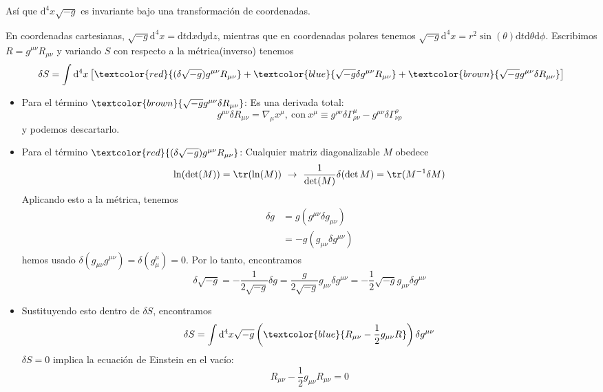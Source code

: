 \documentclass[../main]{subfiles}
\begin{document}
Así que $\mathrm{d}^4 x \sqrt{-g}$ es invariante bajo una transformación de coordenadas.

\ejemplo{} En coordenadas cartesianas, $\sqrt{-g} \mathrm{d}^4 x=\mathrm{d}t\mathrm{d}x\mathrm{d}y\mathrm{d}z$, mientras que en coordenadas polares tenemos $\sqrt{-g}\mathrm{d}^4 x=r^2\sin(\theta)\mathrm{d}t\mathrm{d}\theta\mathrm{d}\phi$. Escribimos $R=g^{\mu\nu}R_{\mu\nu}$ y variando $S$ con respecto a la métrica(inverso) tenemos 
\begin{equation}
    \delta S = \int \mathrm{d}^4 x \left[\textcolor{red}{(\delta \sqrt{-g})g^{\mu\nu}R_{\mu\nu}}+\textcolor{blue}{\sqrt{-g}\delta g^{\mu\nu}R_{\mu\nu}}+\textcolor{brown}{\sqrt{-g}g^{\mu\nu}\delta R_{\mu\nu}}\right]
\end{equation}

\begin{itemize}
    \item Para el término $\textcolor{brown}{\sqrt{-g}g^{\mu\nu}\delta R_{\mu\nu}}$: Es una derivada total:
    \begin{equation}
        g^{\mu\nu}\delta R_{\mu\nu}=\nabla_{\mu}x^{\mu}, \ \text{con} \ x^{\mu} \equiv g^{\rho\nu} \delta \Gamma^{\mu}_{\rho\nu}-g^{\mu\nu}\delta\Gamma^{\rho}_{\nu\rho}
    \end{equation}
    y podemos descartarlo.
    \item Para el término $\textcolor{red}{(\delta \sqrt{-g})g^{\mu\nu}R_{\mu\nu}}$: Cualquier matriz diagonalizable $M$ obedece
    \begin{equation}
        \ln(\det(M))=\tr(\ln(M)) \ \rightarrow \ \dfrac{1}{\det(M)}\delta(\det M)=\tr(M^{-1} \delta M)
    \end{equation}
    Aplicando esto a la métrica, tenemos 
    \begin{equation}
        \begin{split}
            \delta g &= g(g^{\mu\nu}\delta g_{\mu\nu})\\
                     &=-g(g_{\mu\nu}\delta g^{\mu\nu})
        \end{split}
    \end{equation}
    hemos usado $\delta(g_{\mu\nu}g^{\mu\nu})=\delta(g^{\mu}_{\mu})=0$. Por lo tanto, encontramos 
    \begin{equation}
        \delta \sqrt{-g} = -\dfrac{1}{2\sqrt{-g}}\delta g=\dfrac{g}{2\sqrt{-g}}g_{\mu\nu}\delta g^{\mu\nu}=-\dfrac{1}{2}\sqrt{-g}g_{\mu\nu}\delta g^{\mu\nu}
    \end{equation}
    \item Sustituyendo esto dentro de $\delta S$, encontramos 
    \begin{equation}
        \delta S = \int \mathrm{d}^4 x \sqrt{-g}\left(\textcolor{blue}{R_{\mu\nu}-\dfrac{1}{2}g_{\mu\nu}R}\right)\delta g^{\mu\nu}
    \end{equation}
    $\delta S=0$ implica la ecuación de Einstein en el vacío:
    \begin{equation}
        R_{\mu\nu}-\dfrac{1}{2}g_{\mu\nu}R_{\mu\nu}=0
    \end{equation}
\end{itemize}
\end{document}
